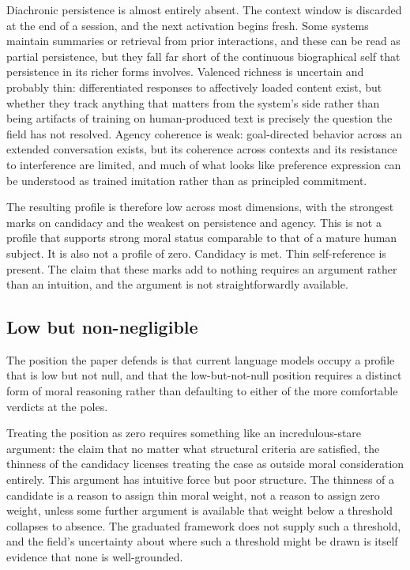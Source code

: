 \documentclass[11pt]{article}
\theoremstyle{foundation}
\begin{document}
Diachronic persistence is almost entirely absent. The context window is discarded at the end of a session, and the next activation begins fresh. Some systems maintain summaries or retrieval from prior interactions, and these can be read as partial persistence, but they fall far short of the continuous biographical self that persistence in its richer forms involves. Valenced richness is uncertain and probably thin: differentiated responses to affectively loaded content exist, but whether they track anything that matters from the system's side rather than being artifacts of training on human-produced text is precisely the question the field has not resolved. Agency coherence is weak: goal-directed behavior across an extended conversation exists, but its coherence across contexts and its resistance to interference are limited, and much of what looks like preference expression can be understood as trained imitation rather than as principled commitment.

The resulting profile is therefore low across most dimensions, with the strongest marks on candidacy and the weakest on persistence and agency. This is not a profile that supports strong moral status comparable to that of a mature human subject. It is also not a profile of zero. Candidacy is met. Thin self-reference is present. The claim that these marks add to nothing requires an argument rather than an intuition, and the argument is not straightforwardly available.

\subsection{Low but non-negligible}

The position the paper defends is that current language models occupy a profile that is low but not null, and that the low-but-not-null position requires a distinct form of moral reasoning rather than defaulting to either of the more comfortable verdicts at the poles.

Treating the position as zero requires something like an incredulous-stare argument: the claim that no matter what structural criteria are satisfied, the thinness of the candidacy licenses treating the case as outside moral consideration entirely. This argument has intuitive force but poor structure. The thinness of a candidate is a reason to assign thin moral weight, not a reason to assign zero weight, unless some further argument is available that weight below a threshold collapses to absence. The graduated framework does not supply such a threshold, and the field's uncertainty about where such a threshold might be drawn is itself evidence that none is well-grounded.
\end{document}
